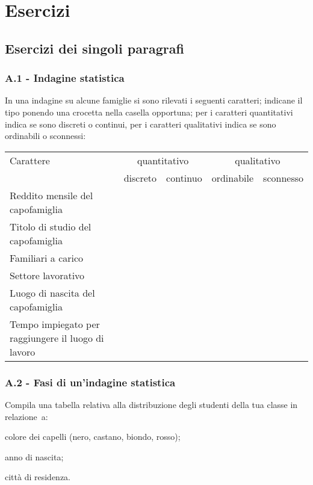 
\section{Esercizi}
\subsection{Esercizi dei singoli paragrafi}
\subsubsection*{A.1 - Indagine statistica}

\begin{esercizio}
\label{ese:A.1}
In una indagine su alcune famiglie si sono rilevati i seguenti caratteri; indicane il tipo ponendo una crocetta nella casella
opportuna; per i caratteri quantitativi indica se sono discreti o continui, per i caratteri qualitativi indica se sono ordinabili o sconnessi:

\begin{center}
 \begin{tabularx}{.95\textwidth}{p{5.5cm}cccc}
\toprule
Carattere & \multicolumn{2}{c}{quantitativo} & \multicolumn{2}{c}{qualitativo}\\
 & discreto & continuo & ordinabile & sconnesso\\
\midrule
Reddito mensile del capofamiglia & & & & \\
Titolo di studio del capofamiglia & & & & \\
Familiari a carico & & & & \\
Settore lavorativo & & & & \\
Luogo di nascita del capofamiglia & & & & \\
Tempo impiegato per raggiungere il luogo di lavoro & & & & \\
\bottomrule
\end{tabularx}
\end{center}
\end{esercizio}

\subsubsection*{A.2 - Fasi di un'indagine statistica}

\begin{esercizio}
\label{ese:A.2}
Compila una tabella relativa alla distribuzione degli studenti della tua classe in relazione~a:
\begin{itemize*}
\item colore dei capelli (nero, castano, biondo, rosso);
\item anno di nascita;
\item città di residenza.
\end{itemize*}
\end{esercizio}

